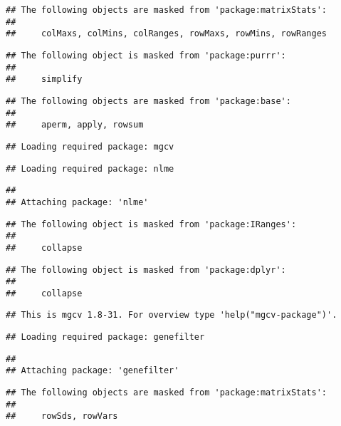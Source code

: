 \documentclass[]{article}
\begin{document}
\begin{verbatim}
## The following objects are masked from 'package:matrixStats':
## 
##     colMaxs, colMins, colRanges, rowMaxs, rowMins, rowRanges
\end{verbatim}

\begin{verbatim}
## The following object is masked from 'package:purrr':
## 
##     simplify
\end{verbatim}

\begin{verbatim}
## The following objects are masked from 'package:base':
## 
##     aperm, apply, rowsum
\end{verbatim}

\begin{verbatim}
## Loading required package: mgcv
\end{verbatim}

\begin{verbatim}
## Loading required package: nlme
\end{verbatim}

\begin{verbatim}
## 
## Attaching package: 'nlme'
\end{verbatim}

\begin{verbatim}
## The following object is masked from 'package:IRanges':
## 
##     collapse
\end{verbatim}

\begin{verbatim}
## The following object is masked from 'package:dplyr':
## 
##     collapse
\end{verbatim}

\begin{verbatim}
## This is mgcv 1.8-31. For overview type 'help("mgcv-package")'.
\end{verbatim}

\begin{verbatim}
## Loading required package: genefilter
\end{verbatim}

\begin{verbatim}
## 
## Attaching package: 'genefilter'
\end{verbatim}

\begin{verbatim}
## The following objects are masked from 'package:matrixStats':
## 
##     rowSds, rowVars
\end{verbatim}
\end{document}
